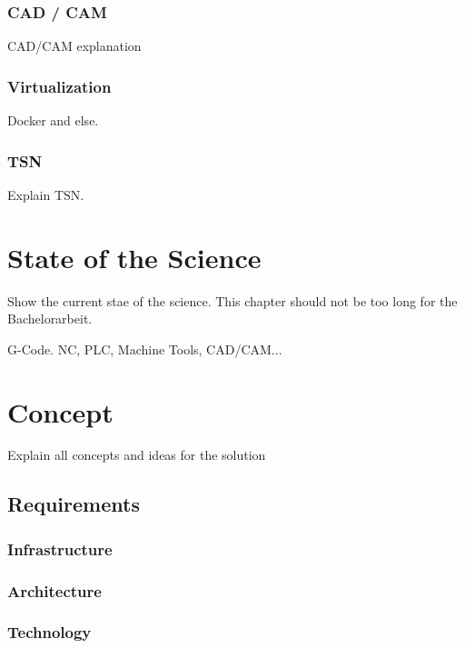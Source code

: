 \documentclass[
a4paper,
twoside,
bibliography=totoc,
headsepline,
cleardoublepage=empty,
parskip=half,
draft=false
]{scrbook}
\begin{document}
				\subsection{CAD / CAM} \label{subsec:cad_cam}
				
					CAD/CAM explanation
					
				\subsection{Virtualization} \label{subsec:virtualization}
				
					Docker and else.
					
				\subsection{TSN} \label{subsec:tsn}
				
					Explain TSN.
						
	\chapter{State of the Science} \label{ch:state_of_the_Science}
	
		Show the current stae of the science. This chapter should not be too long for the Bachelorarbeit.
		
		G-Code. NC, PLC, Machine Tools, CAD/CAM...
	
	\chapter{Concept} \label{ch:concept}
	
		Explain all concepts and ideas for the solution
		
		\section{Requirements} \label{sec:requirements}
		
			\subsection{Infrastructure} \label{subsec:infrastructure}
			
			\subsection{Architecture} \label{subsec:architecture}
			
			\subsection{Technology} \label{subsec:technology}
			
\end{document}
